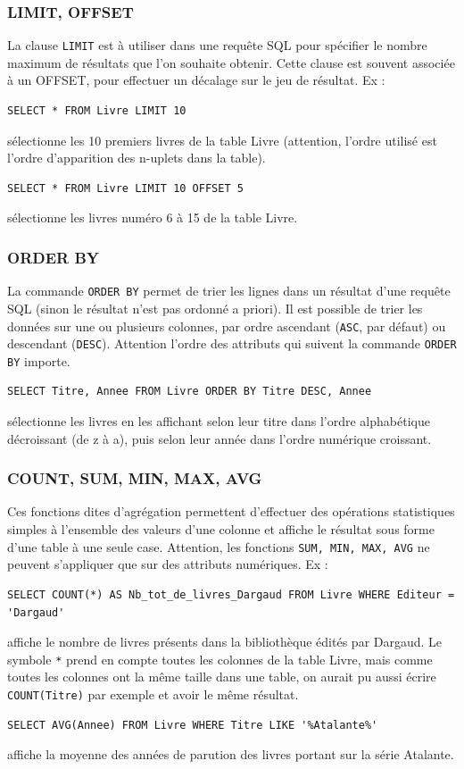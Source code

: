 \documentclass[french,11pt,twoside]{VcCours}
\begin{document}
\subsubsection*{LIMIT, OFFSET}

La clause \verb'LIMIT' est à utiliser dans une requête SQL pour spécifier le nombre maximum de résultats que l’on souhaite obtenir. Cette clause est souvent associée à un OFFSET, pour effectuer un décalage sur le jeu de résultat. Ex :
\begin{verbatim}
SELECT * FROM Livre LIMIT 10
\end{verbatim}
sélectionne les 10 premiers livres de la table Livre (attention, l'ordre utilisé est l'ordre d'apparition des n-uplets dans la table).
\begin{verbatim}
SELECT * FROM Livre LIMIT 10 OFFSET 5
\end{verbatim}
sélectionne les livres numéro 6 à 15 de la table Livre.


\subsubsection*{ORDER BY}

La commande \verb'ORDER BY' permet de trier les lignes dans un résultat d’une requête SQL (sinon le résultat n'est pas ordonné a priori). Il est possible de trier les données sur une ou plusieurs colonnes, par ordre ascendant (\verb'ASC', par défaut) ou descendant (\verb'DESC'). Attention l'ordre des attributs qui suivent la commande \verb'ORDER BY' importe.
\begin{verbatim}
SELECT Titre, Annee FROM Livre ORDER BY Titre DESC, Annee
\end{verbatim}
sélectionne les livres en les affichant selon leur titre dans l'ordre alphabétique décroissant (de z à a), puis selon leur année dans l'ordre numérique croissant.


\subsubsection*{COUNT, SUM, MIN, MAX, AVG}

Ces fonctions dites d'agrégation permettent d'effectuer des opérations statistiques simples à l'ensemble des valeurs d'une colonne et affiche le résultat sous forme d'une table à une seule case. Attention, les fonctions \verb'SUM, MIN, MAX, AVG' ne peuvent s'appliquer que sur des attributs numériques. Ex : 
\begin{verbatim}
SELECT COUNT(*) AS Nb_tot_de_livres_Dargaud FROM Livre WHERE Editeur = 'Dargaud'
\end{verbatim}
affiche le nombre de livres présents dans la bibliothèque édités par Dargaud. Le symbole \verb'*' prend en compte toutes les colonnes de la table Livre, mais comme toutes les colonnes ont la même taille dans une table, on aurait pu aussi écrire  \verb'COUNT(Titre)' par exemple et avoir le même résultat.
\begin{verbatim}
SELECT AVG(Annee) FROM Livre WHERE Titre LIKE '%Atalante%'
\end{verbatim}
affiche la moyenne des années de parution des livres portant sur la série Atalante.
\end{document}
